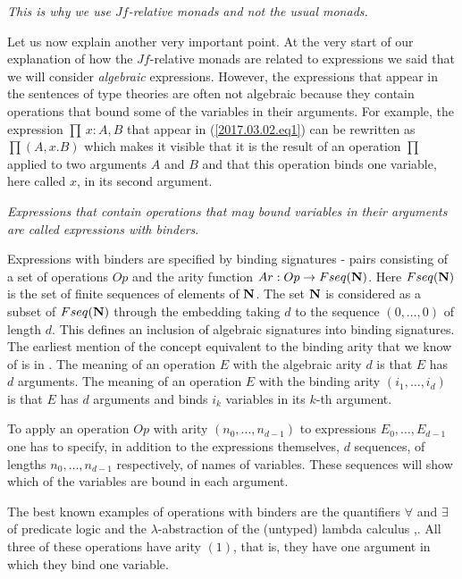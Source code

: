 \documentclass[12pt]{amsart}
\newcommand{\sr}{\rightarrow}
\newcommand{\nn}{{\bf N\rm}}
\newcommand{\nat}{\nn}
\begin{document}
{\em This is why we use $Jf$-relative monads and not the usual monads.}

Let us now explain another very important point. At the very start of our explanation of how the $Jf$-relative monads are related to expressions we said that we will consider {\em algebraic} expressions. However, the expressions that appear in the sentences of type theories are often not algebraic because they contain operations that bound some of the variables in their arguments. For example, the expression $\prod\,x:A,B$ that appear in (\ref{2017.03.02.eq1}) can be rewritten as $\prod(A,x.B)$ which makes it visible that it is the result of an operation $\prod$ applied to two arguments $A$ and $B$ and that this operation binds one variable, here called $x$, in its second argument. 

{\em Expressions that contain operations that may bound variables in their arguments are called expressions with binders}.
 
Expressions with binders are specified by binding signatures 
- pairs consisting of a set of operations $Op$ and the arity function $Ar:Op\sr Fseq(\nat)$. Here $Fseq(\nat)$ is the set of finite sequences of elements of $\nat$. The set $\nat$ is considered as a subset of $Fseq(\nat)$ through the embedding taking $d$ to the sequence $(0,\dots,0)$ of length $d$. This defines an inclusion of algebraic signatures into binding signatures. The earliest mention of the concept equivalent to the binding arity that we know of is in \cite{Aczel1978}. The meaning of an operation $E$ with the algebraic arity $d$ is that $E$ has $d$ arguments. The meaning of an operation $E$ with the binding arity $(i_1,\dots,i_d)$ is that $E$ has $d$ arguments and binds $i_k$ variables in its $k$-th argument. 

To apply an operation $Op$ with arity $(n_0,\dots,n_{d-1})$ to expressions $E_0,\dots,E_{d-1}$ one has to specify, in addition to the expressions themselves, $d$ sequences, of lengths $n_0,\dots,n_{d-1}$ respectively, of names of variables. These sequences will show which of the variables are bound in each argument. 

The best known examples of operations with binders are the quantifiers $\forall$ and $\exists$ of predicate logic and the $\lambda$-abstraction of the (untyped) lambda calculus \cite{Church1932},\cite{Barendregt}. All three of these operations have arity $(1)$, that is, they have one argument in which they bind one variable. 
\end{document}
